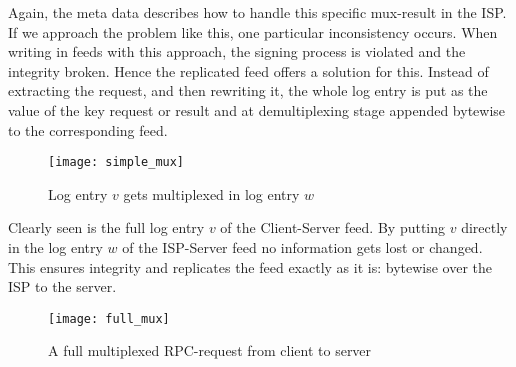 Again, the meta data describes how to handle this specific mux-result in the ISP. If we approach the problem like this, one particular inconsistency occurs. When writing in feeds with this approach, the signing process is violated and the integrity broken. Hence the replicated feed offers a solution for this. Instead of extracting the request, and then rewriting it, the whole log entry is put as the value of the key request or result and at demultiplexing stage appended bytewise to the corresponding feed.\\
\begin{figure}
    \centering
    \texttt{[image: simple\_mux]}
    \caption{Log entry $v$ gets multiplexed in log entry $w$}
    \label{fig:simplemux}
\end{figure}

Clearly seen is the full log entry $v$ of the Client-Server feed. By putting $v$ directly in the log entry $w$ of the ISP-Server feed no information gets lost or changed. This ensures integrity and replicates the feed exactly as it is: bytewise over the ISP to the server. 
\begin{figure}
    \centering
    \texttt{[image: full\_mux]}
    \caption{A full multiplexed RPC-request from client to server}
    \label{fig:fullmux}
\end{figure}